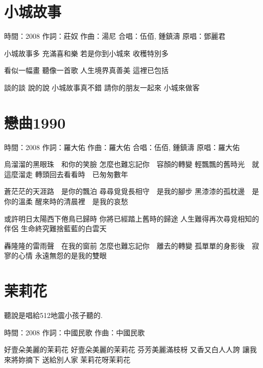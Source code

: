 \documentclass[UTF8,a4paper,oneside,twocolumn,12pt]{ctexbook}
\newcommand{\infopair}[2]{\textbullet #1：#2}
\newcommand{\zc}[1][伍佰]{\infopair{作詞}{#1}}
\newcommand{\zq}[1][伍佰]{\infopair{作曲}{#1}}
\newcommand{\yc}[1]{\infopair{原唱}{#1}}
\newcommand{\sj}[1]{\infopair{時間}{#1}}
\newenvironment{info}{\begin{flushleft}\kaishu
	}
	{\end{flushleft}\normalsize\yahei\par}
\newenvironment{lyric}{
	}
{}
\begin{document}
\section{小城故事}
\begin{info}
	\sj{2008}
	\zc[莊奴]
	\zq[湯尼]
	\infopair{合唱}{伍佰, 鍾鎮濤}
	\yc{鄧麗君}
\end{info}
\begin{lyric}
	小城故事多
	充滿喜和樂
	若是你到小城來
	收穫特別多

	看似一幅畫
	聽像一首歌
	人生境界真善美
	這裡已包括

	談的談 說的說
	小城故事真不錯
	請你的朋友一起來
	小城來做客
\end{lyric}

\section{戀曲1990}
\begin{info}
	\sj{2008}
	\zc[羅大佑]
	\zq[羅大佑]
	\infopair{合唱}{伍佰, 鍾鎮濤}
	\yc{羅大佑}
\end{info}
\begin{lyric}
	烏溜溜的黑眼珠　和你的笑臉
	怎麼也難忘記你　容顏的轉變
	輕飄飄的舊時光　就這麼溜走
	轉頭回去看看時　已匆匆數年

	蒼茫茫的天涯路　是你的飄泊
	尋尋覓覓長相守　是我的腳步
	黑漆漆的孤枕邊　是你的溫柔
	醒來時的清晨裡　是我的哀愁

	或許明日太陽西下倦鳥已歸時
	你將已經踏上舊時的歸途
	人生難得再次尋覓相知的伴侶
	生命終究難捨藍藍的白雲天

	轟隆隆的雷雨聲　在我的窗前
	怎麼也難忘記你　離去的轉變
	孤單單的身影後　寂寥的心情
	永遠無怨的是我的雙眼
\end{lyric}

\section{茉莉花}
\begin{info}

	聽說是唱給512地震小孩子聽的.

	\sj{2008}
	\zc[中國民歌]
	\zq[中國民歌]
\end{info}
\begin{lyric}
	好壹朵美麗的茉莉花
	好壹朵美麗的茉莉花
	芬芳美麗滿枝枒 又香又白人人誇
	讓我來將妳摘下 送給別人家
	茉莉花呀茉莉花
\end{lyric}
\end{document}
